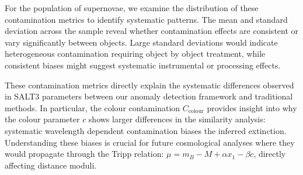 For the population of supernovae, we examine the distribution of these contamination metrics to identify systematic patterns. The mean and standard deviation across the sample reveal whether contamination effects are consistent or vary significantly between objects. Large standard deviations would indicate heterogeneous contamination requiring object by object treatment, while consistent biases might suggest systematic instrumental or processing effects.

These contamination metrics directly explain the systematic differences observed in SALT3 parameters between our anomaly detection framework and traditional methods. In particular, the colour contamination $C_{\mathrm{colour}}$ provides insight into why the colour parameter $c$ shows larger differences in the similarity analysis: systematic wavelength dependent contamination biases the inferred extinction. Understanding these biases is crucial for future cosmological analyses where they would propagate through the Tripp relation: $\mu = m_B - M + \alpha x_1 - \beta c$, directly affecting distance moduli.
